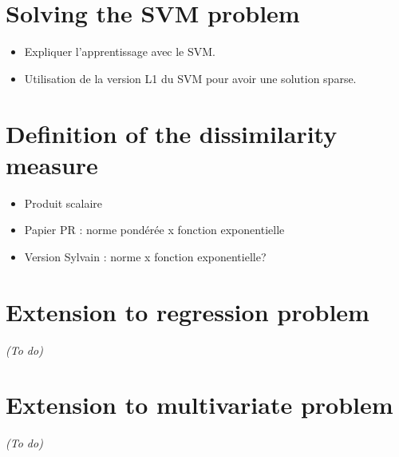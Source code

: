 \section{Solving the SVM problem}
\begin{itemize}
	\item Expliquer l'apprentissage avec le SVM.
	\item Utilisation de la version L1 du SVM pour avoir une solution sparse.
\end{itemize}


\section{Definition of the dissimilarity measure}
\begin{itemize}
	\item Produit scalaire
	\item Papier PR : norme pondérée x fonction exponentielle
	\item Version Sylvain : norme x fonction exponentielle?
\end{itemize}


\section{Extension to regression problem}
\textit{(To do)}

\section{Extension to multivariate problem}
\textit{(To do)}



